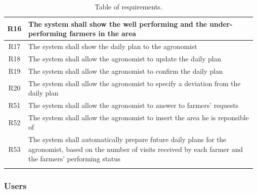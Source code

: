 \begin{center}
\begin{longtable}{|c|m{}|}
            \hline
            \textsc{R16}  &    The system shall show the well performing and the under-performing farmers in the area  \\
            \hline
            \textsc{R17}  &    The system shall show the daily plan to the agronomist  \\
            \hline
            \textsc{R18}  &    The system shall allow the agronomist to update the daily plan  \\
            \hline
            \textsc{R19}  &    The system shall allow the agronomist to confirm the daily plan  \\
            \hline
            \textsc{R20}  &    The system shall allow the agronomist to specify a deviation from the daily plan  \\
            \hline
            \textsc{R51}  &    The system shall allow the agronomist to answer to farmers' requests  \\
            \hline
            \textsc{R52}  &    The system shall allow the agronomist to insert the area he is reponsible of  \\
            \hline
            \textsc{R53}  &    The system shall automatically prepare future daily plans for the agronomist, based on the number of visits received by each farmer and the farmers' performing status  \\
            \hline
        
        \rowcolor{white}\caption{\label{tab:requirements}Table of requirements.}
        
    \end{longtable}
\end{center}


\subsubsection{Users}
\label{sect:users_requirements}


